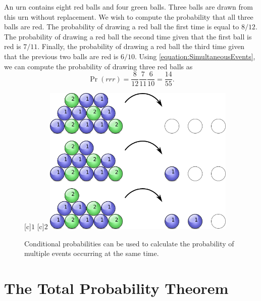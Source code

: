 \begin{example}
An urn contains eight red balls and four green balls.
Three balls are drawn from this urn without replacement.
We wish to compute the probability that all three balls are red.
The probability of drawing a red ball the first time is equal to $8/12$.
The probability of drawing a red ball the second time given that the first ball is red is $7/11$.
Finally, the probability of drawing a red ball the third time given that the previous two balls are red is $6/10$.
Using \eqref{equation:SimultaneousEvents}, we can compute the probability of drawing three red balls as
\begin{equation*}
\Pr (rrr)
= \frac{8}{12} \frac{7}{11} \frac{6}{10}
= \frac{14}{55} .
\end{equation*}

\begin{figure}[htb!]
\begin{center}
\begin{psfrags}
[c]{$1$}
[c]{$2$}
\includegraphics[height=7.11cm]{Figures/3Chapter/balls}
\end{psfrags}
\caption{Conditional probabilities can be used to calculate the probability of multiple events occurring at the same time.}
\label{figure:Balls}
\end{center}
\end{figure}
\end{example}


\section{The Total Probability Theorem}

